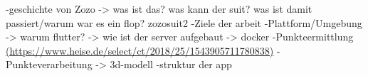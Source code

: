 -geschichte von Zozo
-> was ist das? was kann der suit? was ist damit passiert/warum war es ein flop? zozosuit2
-Ziele der arbeit
-Plattform/Umgebung
-> warum flutter?
-> wie ist der server aufgebaut
-> docker
-Punkteermittlung \url{(https://www.heise.de/select/ct/2018/25/1543905711780838)}
-Punkteverarbeitung
-> 3d-modell
-struktur der app